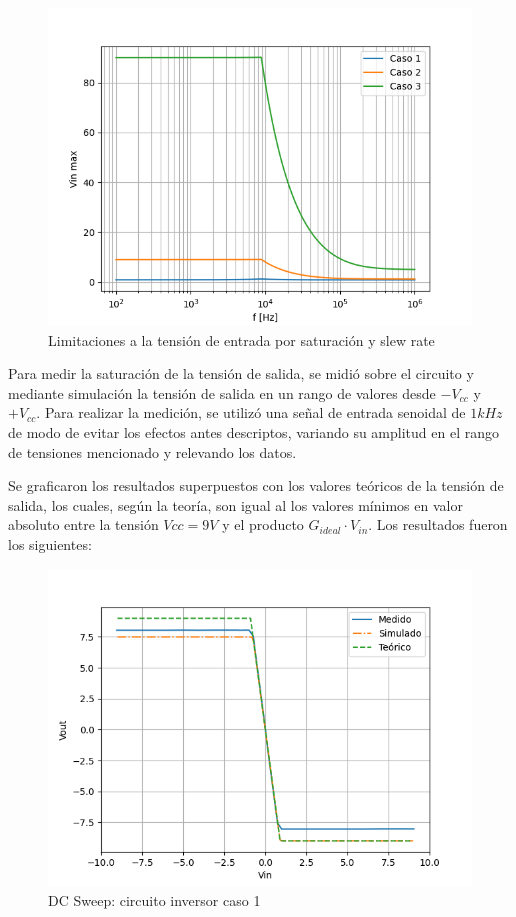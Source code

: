 \begin{figure}[H]
	\centering
	\includegraphics[scale=0.5]{./Imagenes/InvVinMin.png}
	\caption{Limitaciones a la tensión de entrada por saturación y slew rate}
	\label{fig:circinvcaso1}
\end{figure}

Para medir la saturación de la tensión de salida, se midió sobre el circuito y mediante simulación la tensión de salida en un rango de valores desde $-V_{cc}$ y $+V_{cc}$. Para realizar la medición, se utilizó una señal de entrada senoidal de $1kHz$ de modo de evitar los efectos antes descriptos, variando su amplitud en el rango de tensiones mencionado y relevando los datos. 

Se graficaron los resultados superpuestos con los valores teóricos de la tensión de salida, los cuales, según la teoría, son igual al los valores mínimos en valor absoluto entre la tensión $Vcc = 9V$ y el producto $G_{ideal} \cdot V_{in}$. Los resultados fueron los siguientes:

\begin{figure}[H]
	\centering
	\includegraphics[scale=0.5]{./Imagenes/InvCaso1DC.png}
	\caption{DC Sweep: circuito inversor caso 1}
	\label{fig:circinvcaso1}
\end{figure}


